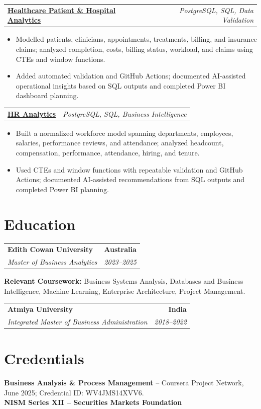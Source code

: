 \documentclass[letterpaper,10pt]{article}
\makeatletter
\newcommand{\role}[4]{%
  \begin{tabularx}{\textwidth}{@{}Xr@{}}
    \textbf{#1} & \textbf{#2} \\
    \textit{#3} & \textit{#4}
  \end{tabularx}\vspace{-1pt}
}
\newcommand{\project}[2]{%
  \begin{tabularx}{\textwidth}{@{}Xr@{}}
    \textbf{#1} & \textit{#2}
  \end{tabularx}\vspace{-1pt}
}
\makeatother
\begin{document}
\project{\href{https://github.com/jainalimehta/Healthcare-Analytics}{Healthcare Patient \& Hospital Analytics}}{PostgreSQL, SQL, Data Validation}
\begin{itemize}
  \item Modelled patients, clinicians, appointments, treatments, billing, and insurance claims; analyzed completion, costs, billing status, workload, and claims using CTEs and window functions.
  \item Added automated validation and GitHub Actions; documented AI-assisted operational insights based on SQL outputs and completed Power BI dashboard planning.
\end{itemize}
\vspace{1pt}

\project{\href{https://github.com/jainalimehta/HR-Analytics}{HR Analytics}}{PostgreSQL, SQL, Business Intelligence}
\begin{itemize}
  \item Built a normalized workforce model spanning departments, employees, salaries, performance reviews, and attendance; analyzed headcount, compensation, performance, attendance, hiring, and tenure.
  \item Used CTEs and window functions with repeatable validation and GitHub Actions; documented AI-assisted recommendations from SQL outputs and completed Power BI planning.
\end{itemize}

\section{Education}
\role{Edith Cowan University}{Australia}{Master of Business Analytics}{2023--2025}
\small\textbf{Relevant Coursework:} Business Systems Analysis, Databases and Business Intelligence, Machine Learning, Enterprise Architecture, Project Management.\\[2pt]
\role{Atmiya University}{India}{Integrated Master of Business Administration}{2018--2022}

\section{Credentials}
\small\textbf{Business Analysis \& Process Management} -- Coursera Project Network, June 2025; Credential ID: WV4JMS14XVV6.\\[-0.2pt]
\small\textbf{NISM Series XII -- Securities Markets Foundation}
\end{document}
